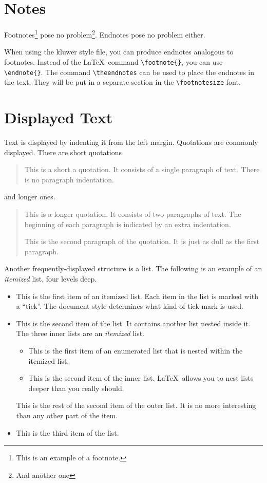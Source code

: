 \documentclass{kluwer}    %
\begin{document}
\begin{article}
\section{Notes}
Footnotes\footnote{This is an example of a footnote.}
pose no problem\footnote{And another one}.
Endnotes pose no 
problem either.

When using the {\sc kluwer} style file, you can produce endnotes 
analogous to footnotes. Instead of the \LaTeX\ command \verb+\footnote{}+,
you can use \verb+\endnote{}+. The command \verb+\theendnotes+ can be used
to place the endnotes in the text. They will be put in a separate section in
the \verb+\footnotesize+ font.



\section{Displayed Text}

Text is displayed by indenting it from the left margin.
Quotations are commonly displayed.  There are short quotations
\begin{quote}
   This is a short a quotation.  It consists of a 
   single paragraph of text.  There is no paragraph
   indentation.
\end{quote}
and longer ones.
\begin{quotation}
   This is a longer quotation.  It consists of two paragraphs
   of text.  The beginning of each paragraph is indicated
   by an extra indentation.

   This is the second paragraph of the quotation.  It is just
   as dull as the first paragraph.
\end{quotation}
Another frequently-displayed structure is a list.
The following is an example of an {\em itemized} list, four levels deep.
\begin{itemize}
\item  This is the first item of an itemized list.  Each item 
      in the list is marked with a ``tick''.  The document
      style determines what kind of tick mark is used.
\item  This is the second item of the list.  It contains another
      list nested inside it.  The three inner lists are an {\em itemized}
      list.
    \begin{itemize}
       \item This is the first item of an enumerated list that
            is nested within the itemized list.
          \item This is the second item of the inner list.  \LaTeX\
            allows you to nest lists deeper than you really should.
      \end{itemize}
      This is the rest of the second item of the outer list.  It
      is no more interesting than any other part of the item.
   \item  This is the third item of the list.
\end{itemize}



\end{article}
\end{document}
